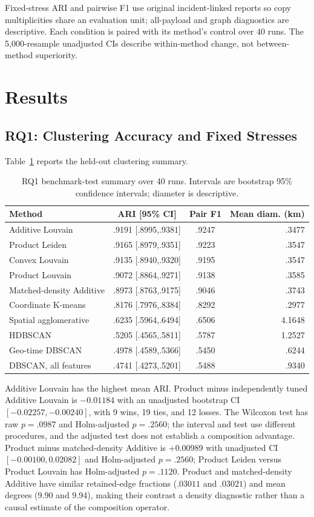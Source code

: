 \documentclass[runningheads]{llncs}
\begin{document}
Fixed-stress ARI and pairwise F1 use original incident-linked reports so copy
multiplicities share an evaluation unit; all-payload and graph diagnostics are
descriptive. Each condition is paired with its method's control over 40 runs.
The 5,000-resample unadjusted CIs describe within-method change, not
between-method superiority.

\section{Results}
\label{sec:results}

\subsection{RQ1: Clustering Accuracy and Fixed Stresses}

Table~\ref{tab:clustering-results} reports the held-out clustering summary.
\begin{table}[!htbp]
\centering\scriptsize
\caption{RQ1 benchmark-test summary over 40 runs. Intervals are bootstrap
95\% confidence intervals; diameter is descriptive.}
\label{tab:clustering-results}
\begin{tabular}{lccr}
\toprule
Method & ARI [95\% CI] & Pair F1 & Mean diam. (km)\\
\midrule
Additive Louvain & .9191 [.8995,.9381] & .9247 & .3477\\
Product Leiden & .9165 [.8979,.9351] & .9223 & .3547\\
Convex Louvain & .9135 [.8940,.9320] & .9195 & .3547\\
Product Louvain & .9072 [.8864,.9271] & .9138 & .3585\\
Matched-density Additive & .8973 [.8763,.9175] & .9046 & .3743\\
Coordinate K-means & .8176 [.7976,.8384] & .8292 & .2977\\
Spatial agglomerative & .6235 [.5964,.6494] & .6506 & 4.1648\\
HDBSCAN & .5205 [.4565,.5811] & .5787 & 1.2527\\
Geo-time DBSCAN & .4978 [.4589,.5366] & .5450 & .6244\\
DBSCAN, all features & .4741 [.4273,.5201] & .5488 & .9340\\
\bottomrule
\end{tabular}
\end{table}

Additive Louvain has the highest mean ARI. Product minus independently tuned
Additive Louvain is $-0.01184$ with an unadjusted bootstrap CI
$[-0.02257,-0.00240]$, with 9 wins, 19 ties, and 12 losses. The Wilcoxon test
has raw $p=.0987$ and Holm-adjusted $p=.2560$; the interval and test use
different procedures, and the adjusted test does not establish a composition
advantage. Product minus matched-density Additive is $+0.00989$ with
unadjusted CI $[-0.00100,0.02082]$ and Holm-adjusted $p=.2560$; Product Leiden
versus Product Louvain has Holm-adjusted $p=.1120$. Product and matched-density
Additive have similar retained-edge fractions ($.03011$ and $.03021$) and mean
degrees (9.90 and 9.94), making their contrast a density diagnostic rather
than a causal estimate of the composition operator.
\end{document}
